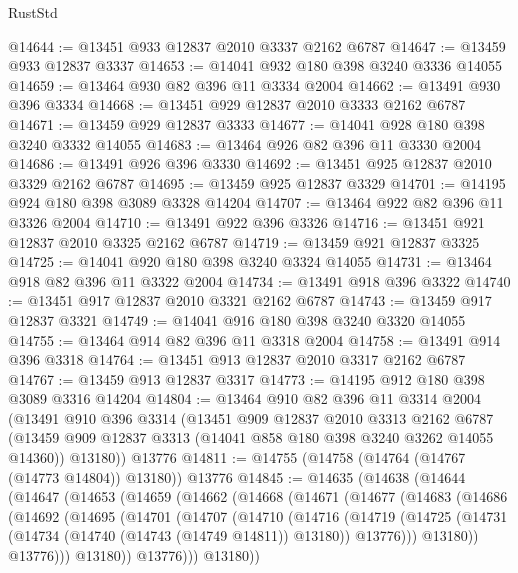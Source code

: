 \begin{lexlean}{RustStd}
\begin{coremodule}
@14644 := @13451 @933 @12837 @2010 @3337 @2162 @6787
@14647 := @13459 @933 @12837 @3337
@14653 := @14041 @932 @180 @398 @3240 @3336 @14055
@14659 := @13464 @930 @82 @396 @11 @3334 @2004
@14662 := @13491 @930 @396 @3334
@14668 := @13451 @929 @12837 @2010 @3333 @2162 @6787
@14671 := @13459 @929 @12837 @3333
@14677 := @14041 @928 @180 @398 @3240 @3332 @14055
@14683 := @13464 @926 @82 @396 @11 @3330 @2004
@14686 := @13491 @926 @396 @3330
@14692 := @13451 @925 @12837 @2010 @3329 @2162 @6787
@14695 := @13459 @925 @12837 @3329
@14701 := @14195 @924 @180 @398 @3089 @3328 @14204
@14707 := @13464 @922 @82 @396 @11 @3326 @2004
@14710 := @13491 @922 @396 @3326
@14716 := @13451 @921 @12837 @2010 @3325 @2162 @6787
@14719 := @13459 @921 @12837 @3325
@14725 := @14041 @920 @180 @398 @3240 @3324 @14055
@14731 := @13464 @918 @82 @396 @11 @3322 @2004
@14734 := @13491 @918 @396 @3322
@14740 := @13451 @917 @12837 @2010 @3321 @2162 @6787
@14743 := @13459 @917 @12837 @3321
@14749 := @14041 @916 @180 @398 @3240 @3320 @14055
@14755 := @13464 @914 @82 @396 @11 @3318 @2004
@14758 := @13491 @914 @396 @3318
@14764 := @13451 @913 @12837 @2010 @3317 @2162 @6787
@14767 := @13459 @913 @12837 @3317
@14773 := @14195 @912 @180 @398 @3089 @3316 @14204
@14804 := @13464
    @910
    @82
    @396
    @11
    @3314
    @2004
    (@13491
      @910
      @396
      @3314
      (@13451
        @909
        @12837
        @2010
        @3313
        @2162
        @6787
        (@13459 @909 @12837 @3313 (@14041 @858 @180 @398 @3240 @3262 @14055 @14360))
        @13180))
    @13776
@14811 := @14755 (@14758 (@14764 (@14767 (@14773 @14804)) @13180)) @13776
@14845 := @14635
    (@14638
      (@14644
        (@14647
          (@14653
            (@14659
              (@14662
                (@14668
                  (@14671
                    (@14677
                      (@14683
                        (@14686
                          (@14692
                            (@14695
                              (@14701
                                (@14707
                                  (@14710
                                    (@14716
                                      (@14719
                                        (@14725
                                          (@14731
                                            (@14734 (@14740 (@14743 (@14749 @14811)) @13180))
                                            @13776)))
                                      @13180))
                                  @13776)))
                            @13180))
                        @13776)))
                  @13180))

\end{coremodule}
\end{lexlean}
